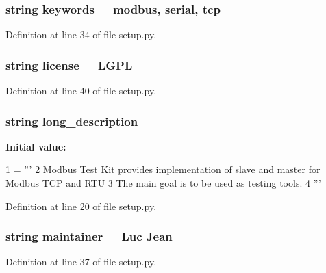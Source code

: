 \subsubsection[{keywords}]{\setlength{\rightskip}{0pt plus 5cm}string keywords = \textquotesingle{}modbus, serial, tcp\textquotesingle{}}\label{namespacesetup_a4ff3826b383daec67638b9f024e7713d}


Definition at line 34 of file setup.\+py.

\subsubsection[{license}]{\setlength{\rightskip}{0pt plus 5cm}string license = \textquotesingle{}L\+G\+P\+L\textquotesingle{}}\label{namespacesetup_a3b0df2d8b18e862fa63bf6f4cc08a8cb}


Definition at line 40 of file setup.\+py.

\subsubsection[{long\+\_\+description}]{\setlength{\rightskip}{0pt plus 5cm}string long\+\_\+description}\label{namespacesetup_a4596629cef848af66766763bf4028ff4}
{\bfseries Initial value\+:}
\begin{DoxyCode}
1 = \textcolor{stringliteral}{'''}
2 \textcolor{stringliteral}{    Modbus Test Kit provides implementation of slave and master for Modbus TCP and RTU }
3 \textcolor{stringliteral}{    The main goal is to be used as testing tools.}
4 \textcolor{stringliteral}{    '''}
\end{DoxyCode}


Definition at line 20 of file setup.\+py.

\subsubsection[{maintainer}]{\setlength{\rightskip}{0pt plus 5cm}string maintainer = \textquotesingle{}Luc Jean\textquotesingle{}}\label{namespacesetup_afc5bb60d8f0cde6da60198c9e44871b8}


Definition at line 37 of file setup.\+py.

